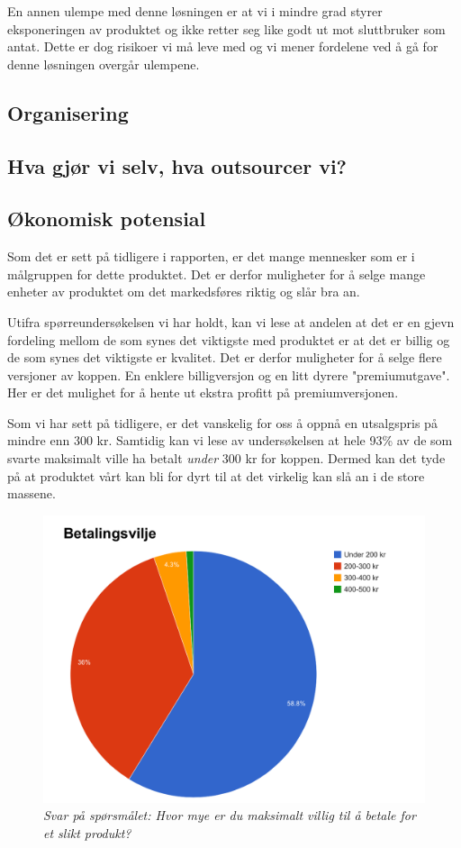 En annen ulempe med denne løsningen er at vi i mindre grad styrer eksponeringen av produktet og ikke retter seg like godt ut mot sluttbruker som antat. Dette er dog risikoer vi må leve med og vi mener fordelene ved å gå for denne løsningen overgår ulempene.
\subsection{Organisering}



\subsection{Hva gjør vi selv, hva outsourcer vi?}



\subsection{Økonomisk potensial}
Som det er sett på tidligere i rapporten, er det mange mennesker som er i målgruppen for dette produktet. Det er derfor muligheter for å selge mange enheter av produktet om det markedsføres riktig og slår bra an.

Utifra spørreundersøkelsen vi har holdt, kan vi lese at andelen at det er en gjevn fordeling mellom de som synes det viktigste med produktet er at det er billig og de som synes det viktigste er kvalitet. Det er derfor muligheter for å selge flere versjoner av koppen. En enklere billigversjon og en litt dyrere "premiumutgave". Her er det mulighet for å hente ut ekstra profitt på premiumversjonen.

Som vi har sett på tidligere, er det vanskelig for oss å oppnå en utsalgspris på mindre enn 300 kr. 
Samtidig kan vi lese av undersøkelsen at hele 93\% av de som svarte maksimalt ville ha betalt \textit{under} 300 kr for koppen. Dermed kan det tyde på at produktet vårt kan bli for dyrt til at det virkelig kan slå an i de store massene.

\begin{figure}
\centering
\includegraphics[scale=0.3]{images/ModelForBetalingsvilje.png}
{\caption{\textit{\scriptsize Svar på spørsmålet: Hvor mye er du maksimalt villig til å betale for et slikt produkt?}}}
\label{fig:betalingsvilje}
\end{figure} 

